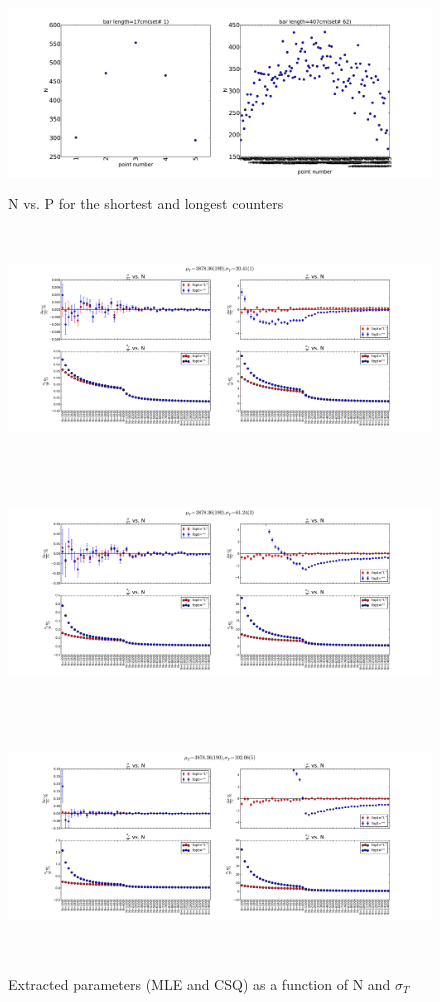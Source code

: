 \documentclass[12pt]{article}
\begin{document}
\begin{figure}[ht]
	\includegraphics[height=2in,width=5in]{bar_stats_write-up_N-vs-p.pdf}
	\caption{N vs. P for the shortest and longest counters}
	\label{fig1}
\end{figure}

\begin{figure}[ht]
	\includegraphics[height=2.5in,width=5.5in]{fit-comp_MU-190_SG-1_fit-opt-L_binw-025.pdf}
	\includegraphics[height=2.5in,width=5.5in]{fit-comp_MU-190_SG-3_fit-opt-L_binw-025.pdf}
	\includegraphics[height=2.5in,width=5.5in]{fit-comp_MU-190_SG-5_fit-opt-L_binw-025.pdf}
	\caption{Extracted parameters (MLE and CSQ) as a function of N and $\sigma_{T}$}
	\label{fig2}
\end{figure}
\end{document}

